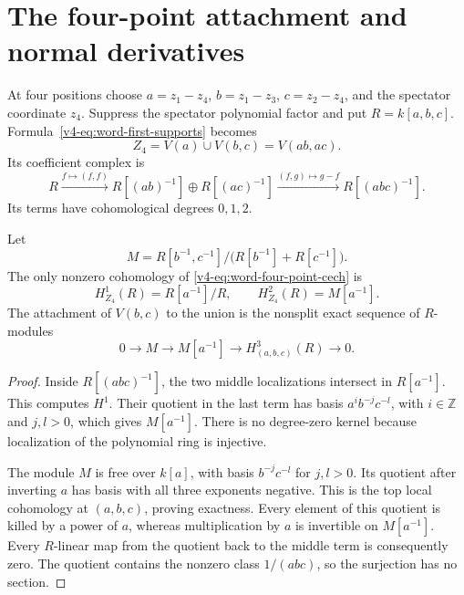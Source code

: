 \section{The four-point attachment and normal derivatives}
\label{v4-sec:word-four-point-attachment}

At four positions choose
\(a=z_1-z_4\), \(b=z_1-z_3\), \(c=z_2-z_4\), and the
spectator coordinate \(z_4\). Suppress the spectator polynomial
factor and put \(R=k[a,b,c]\). Formula~\eqref{v4-eq:word-first-supports}
becomes
\[
 Z_4=V(a)\cup V(b,c)=V(ab,ac).
\]
Its coefficient complex is
\begin{equation}\label{v4-eq:word-four-point-cech}
 R\xrightarrow{f\mapsto(f,f)}
 R[(ab)^{-1}]\oplus R[(ac)^{-1}]
 \xrightarrow{(f,g)\mapsto g-f}R[(abc)^{-1}].
\end{equation}
Its terms have cohomological degrees \(0,1,2\).

\begin{proposition}
\label{v4-prop:word-four-point-nonsplit}
Let
\[
 M=R[b^{-1},c^{-1}]\big/
                  \bigl(R[b^{-1}]+R[c^{-1}]\bigr).
\]
The only nonzero cohomology of
\eqref{v4-eq:word-four-point-cech} is
\[
 H^1_{Z_4}(R)=R[a^{-1}]/R,\qquad
 H^2_{Z_4}(R)=M[a^{-1}].
\]
The attachment of \(V(b,c)\) to the union is the nonsplit exact
sequence of \(R\)-modules
\begin{equation}\label{v4-eq:word-four-point-extension}
 0\longrightarrow M\longrightarrow M[a^{-1}]
   \longrightarrow H^3_{(a,b,c)}(R)\longrightarrow0.
\end{equation}
\end{proposition}

\begin{proof}
Inside \(R[(abc)^{-1}]\), the two middle localizations intersect
in \(R[a^{-1}]\). This computes \(H^1\). Their quotient in
the last term has basis \(a^i b^{-j}c^{-l}\), with
\(i\in\mathbb Z\) and \(j,l>0\), which gives \(M[a^{-1}]\).
There is no degree-zero kernel because localization of the
polynomial ring is injective.

The module \(M\) is free over \(k[a]\), with basis
\(b^{-j}c^{-l}\) for \(j,l>0\). Its quotient after inverting
\(a\) has basis with all three exponents negative. This is the
top local cohomology at \((a,b,c)\), proving exactness. Every
element of this quotient is killed by a power of \(a\), whereas
multiplication by \(a\) is invertible on \(M[a^{-1}]\).
Every \(R\)-linear map from the quotient back to the middle term
is consequently zero. The quotient contains the nonzero class
\(1/(abc)\), so the surjection has no section.
\end{proof}

